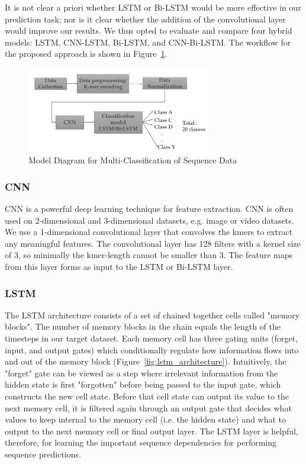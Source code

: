 \documentclass[journal]{IEEEtran}
\begin{document}
    It is not clear a priori whether LSTM or Bi-LSTM would be more effective in our prediction task; nor is it clear
    whether the addition of the convolutional layer would improve our results. We thus opted to evaluate and compare
    four hybrid models: LSTM, CNN-LSTM, Bi-LSTM, and CNN-Bi-LSTM.
    The workflow for the proposed approach is shown in Figure~\ref{fig:model_diagram}.

    \begin{figure}[h]
      \centering
      \includegraphics[width=8cm]{figures/Model_Diagram.JPG}
      \caption{Model Diagram for Multi-Classification of Sequence Data}
      \label{fig:model_diagram}
    \end{figure}

    \subsubsection{CNN}
      CNN is a powerful deep learning technique for feature extraction.
      CNN is often used on 2-dimensional and 3-dimensional datasets, e.g. image or video datasets.
      We use a 1-dimensional convolutional layer that convolves the kmers to extract any meaningful
      features. The convolutional layer has 128 filters with a kernel size of 3, so minimally the kmer-length cannot be
      smaller than 3. The feature maps from this layer forms as input to the LSTM or Bi-LSTM layer.

    \subsubsection{LSTM}
      The LSTM architecture consists of a set of chained together cells called "memory blocks". The number
      of memory blocks in the chain equals the length of the timesteps in our target dataset.
      Each memory cell has three gating units (forget, input, and output gates) which
      conditionally regulate how information flows into and out of the memory block (Figure~\ref{fig:lstm_architecture}). 
      Intuitively, the "forget" gate can be viewed as a step where irrelevant information from the hidden state
      is first "forgotten" before being passed to the input gate, which constructs the new cell state.
      Before that cell state can output its value to the next memory cell, it is filtered again through
      an output gate that decides what values to keep internal to the memory cell (i.e. the hidden state)
      and what to output to the next memory cell or final output layer.
      The LSTM layer is helpful, therefore, for learning the important sequence dependencies for performing
      sequence predictions.
\end{document}
